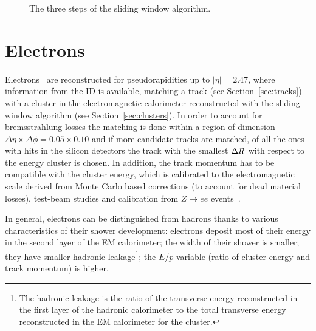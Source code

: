 \begin{figure}[tb]\begin{center}
	\caption{The three steps of the sliding window algorithm.
	\label{fig:sliding}}
\end{center}\end{figure}

\section{Electrons}\label{sec:electrons}

Electrons~\cite{eperf} are reconstructed for pseudorapidities up to $|\eta| = 2.47$, where
information from the ID is available, matching a track (see Section~\ref{sec:tracks}) 
with a cluster in the electromagnetic calorimeter reconstructed with the sliding window 
algorithm (see Section~\ref{sec:clusters}).
In order to account for bremsstrahlung losses the matching is done within a region
of dimension $\Delta\eta\times\Delta\phi=0.05\times0.10$ and if more candidate
tracks are matched, of all the ones with hits in the silicon detectors
the track with the smallest $\dr$ with respect to the
energy cluster is chosen. In addition, the track momentum has to be compatible
with the cluster energy, which is calibrated to the electromagnetic scale
derived from Monte Carlo based corrections (to account for dead material losses),
test-beam studies and calibration from $Z\to ee$ events~\cite{Abat:1900zz}.

In general, electrons can be distinguished from hadrons thanks to various characteristics
of their shower development: electrons deposit most of their energy in the second layer of
the EM calorimeter; the width of their shower is smaller; they have smaller
hadronic leakage\footnote{The hadronic leakage is the ratio of the transverse energy reconstructed
in the first layer of the hadronic calorimeter to the total  transverse energy reconstructed in the 
EM calorimeter for the cluster.}; the $E/p$ variable (ratio of cluster energy and track momentum) is higher.

